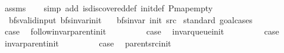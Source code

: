 \begin{isabellebody}
\isamarkupfalse%
\ assms\isanewline
\ \ \isamarkupfalse%
\ {\isacharparenleft}{\kern0pt}simp\ add{\isacharcolon}{\kern0pt}\ is{\isacharunderscore}{\kern0pt}discovered{\isacharunderscore}{\kern0pt}def\ init{\isacharunderscore}{\kern0pt}def\ P{\isachardot}{\kern0pt}map{\isacharunderscore}{\kern0pt}empty{\isacharparenright}{\kern0pt}%
\endisatagproof
{\isafoldproof}%
%
\isadelimproof
\isanewline
%
\endisadelimproof
\isanewline
{}\isamarkupfalse%
\ {\isacharparenleft}{\kern0pt}\ bfs{\isacharunderscore}{\kern0pt}valid{\isacharunderscore}{\kern0pt}input{\isacharparenright}{\kern0pt}\ bfs{\isacharunderscore}{\kern0pt}invar{\isacharunderscore}{\kern0pt}init{\isacharcolon}{\kern0pt}\isanewline
\ \ \ {\isachardoublequoteopen}bfs{\isacharunderscore}{\kern0pt}invar{\isacharprime}{\kern0pt}{\isacharprime}{\kern0pt}\ {\isacharparenleft}{\kern0pt}init\ src{\isacharparenright}{\kern0pt}{\isachardoublequoteclose}\isanewline
%
\isadelimproof
%
\endisadelimproof
%
\isatagproof
{}\isamarkupfalse%
\ {\isacharparenleft}{\kern0pt}standard{\isacharcomma}{\kern0pt}\ goal{\isacharunderscore}{\kern0pt}cases{\isacharparenright}{\kern0pt}\isanewline
\ \ \isamarkupfalse%
\ {}\isanewline
\ \ \isamarkupfalse%
\ {\isacharquery}{\kern0pt}case\ \isamarkupfalse%
\ follow{\isacharunderscore}{\kern0pt}invar{\isacharunderscore}{\kern0pt}parent{\isacharunderscore}{\kern0pt}init\ \isacommand{{\isachardot}{\kern0pt}}\isamarkupfalse%
\isanewline
{}\isamarkupfalse%
\isanewline
\ \ \isamarkupfalse%
\ {}\isanewline
\ \ \isamarkupfalse%
\ {\isacharquery}{\kern0pt}case\ \isamarkupfalse%
\ invar{\isacharunderscore}{\kern0pt}queue{\isacharunderscore}{\kern0pt}init\ \isacommand{{\isachardot}{\kern0pt}}\isamarkupfalse%
\isanewline
{}\isamarkupfalse%
\isanewline
\ \ \isamarkupfalse%
\ {}\isanewline
\ \ \isamarkupfalse%
\ {\isacharquery}{\kern0pt}case\ \isamarkupfalse%
\ invar{\isacharunderscore}{\kern0pt}parent{\isacharunderscore}{\kern0pt}init\ \isacommand{{\isachardot}{\kern0pt}}\isamarkupfalse%
\isanewline
{}\isamarkupfalse%
\isanewline
\ \ \isamarkupfalse%
\ {}\isanewline
\ \ \isamarkupfalse%
\ {\isacharquery}{\kern0pt}case\ \isamarkupfalse%
\ parent{\isacharunderscore}{\kern0pt}src{\isacharunderscore}{\kern0pt}init\ \isacommand{{\isachardot}{\kern0pt}}\isamarkupfalse%

\end{isabellebody}
